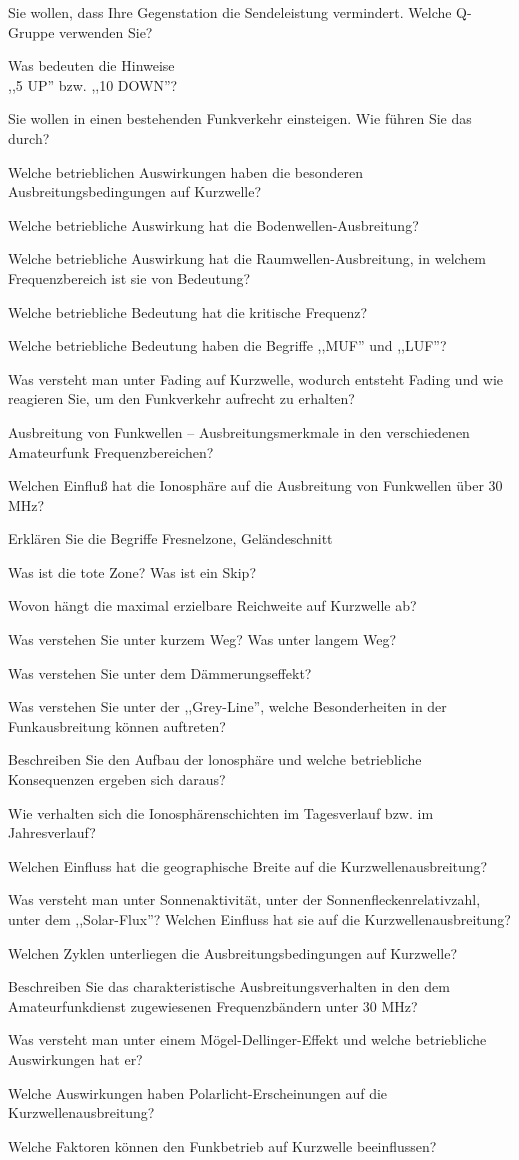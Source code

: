 \documentclass[avery5371,grid,frame,a4paper]{flashcards}
\newcommand\question[2]{
  \begin{flashcard}[{\chap} -- #1]{#2}\end{flashcard}
}
\begin{document}
\question{04}{Sie wollen, dass Ihre Gegenstation die Sendeleistung vermindert. Welche Q-Gruppe verwenden Sie?}{}
\question{05}{Was bedeuten die Hinweise \\ ,,5 UP'' bzw. ,,10 DOWN''?}{}
\question{06}{Sie wollen in einen bestehenden Funkverkehr einsteigen. Wie führen Sie das durch?}{}
\question{07}{Welche betrieblichen Auswirkungen haben die besonderen Ausbreitungsbedingungen auf Kurzwelle?}{}
\question{08}{Welche betriebliche Auswirkung hat die Bodenwellen-Ausbreitung?}{}
\question{09}{Welche betriebliche Auswirkung hat die Raumwellen-Ausbreitung, in welchem Frequenzbereich ist sie von Bedeutung?}{}
\question{10}{Welche betriebliche Bedeutung hat die kritische Frequenz?}{}
\question{11}{Welche betriebliche Bedeutung haben die Begriffe ,,MUF'' und ,,LUF''?}{}
\question{12}{Was versteht man unter Fading auf Kurzwelle, wodurch entsteht Fading und wie reagieren Sie, um den Funkverkehr aufrecht zu erhalten?}{}
\question{13}{Ausbreitung von Funkwellen -- Ausbreitungsmerkmale in den verschiedenen Amateurfunk Frequenzbereichen?}{}
\question{14}{Welchen Einfluß hat die Ionosphäre auf die Ausbreitung von Funkwellen über 30 MHz?}{}
\question{15}{Erklären Sie die Begriffe Fresnelzone, Geländeschnitt}{}
\question{16}{Was ist die tote Zone? Was ist ein Skip?}{}
\question{17}{Wovon hängt die maximal erzielbare Reichweite auf Kurzwelle ab?}
\question{18}{Was verstehen Sie unter kurzem Weg? Was unter langem Weg?}
\question{19}{Was verstehen Sie unter dem Dämmerungseffekt?}
\question{20}{Was verstehen Sie unter der ,,Grey-Line'', welche Besonderheiten in der Funkausbreitung können auftreten?}
\question{21}{Beschreiben Sie den Aufbau der lonosphäre und welche betriebliche Konsequenzen ergeben sich daraus?}
\question{22}{Wie verhalten sich die Ionosphärenschichten im Tagesverlauf bzw. im Jahresverlauf?}
\question{23}{Welchen Einfluss hat die geographische Breite auf die Kurzwellenausbreitung?}
\question{24}{Was versteht man unter Sonnenaktivität, unter der Sonnenfleckenrelativzahl, unter dem ,,Solar-Flux''? Welchen Einfluss hat sie auf die Kurzwellenausbreitung?}
\question{25}{Welchen Zyklen unterliegen die Ausbreitungsbedingungen auf Kurzwelle?}
\question{26}{Beschreiben Sie das charakteristische Ausbreitungsverhalten in den dem Amateurfunkdienst zugewiesenen Frequenzbändern unter 30 MHz?}
\question{27}{Was versteht man unter einem Mögel-Dellinger-Effekt und welche betriebliche Auswirkungen hat er?}
\question{28}{Welche Auswirkungen haben Polarlicht-Erscheinungen auf die Kurzwellenausbreitung?}
\question{29}{Welche Faktoren können den Funkbetrieb auf Kurzwelle beeinflussen?}
\end{document}
